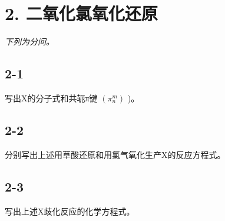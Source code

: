 \section*{2. 二氧化氯氧化还原}
\textit{下列为分问。}

\subsection*{2-1}
写出X的分⼦式和共轭π键 $( \pi _ { n } ^ { m } )$ )。

\subsection*{2-2}
分别写出上述⽤草酸还原和⽤氯⽓氧化⽣产X的反应⽅程式。

\subsection*{2-3}
写出上述X歧化反应的化学⽅程式。
